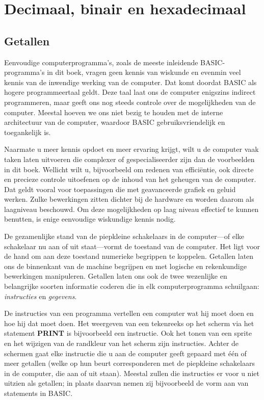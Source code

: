 \chapter{Decimaal, binair en hexadecimaal}
\label{cha:decimal-binary-and-hexadecimal}

\section{Getallen}Eenvoudige computerprogramma's, zoals de meeste inleidende BASIC-programma's in dit boek, vragen geen kennis van wiskunde en evenmin veel kennis van de inwendige werking van de computer. Dat komt doordat BASIC als hogere programmeertaal geldt. Deze taal laat ons de computer enigszins indirect programmeren, maar geeft ons nog steeds controle over de mogelijkheden van de computer. Meestal hoeven we ons niet bezig te houden met de interne architectuur van de computer, waardoor BASIC gebruiksvriendelijk en toegankelijk is.

Naarmate u meer kennis opdoet en meer ervaring krijgt, wilt u de computer vaak taken laten uitvoeren die complexer of gespecialiseerder zijn dan de voorbeelden in dit boek. Wellicht wilt u, bijvoorbeeld om redenen van efficiëntie, ook directe en precieze controle uitoefenen op de inhoud van het geheugen van de computer. Dat geldt vooral voor toepassingen die met geavanceerde grafiek en geluid werken. Zulke bewerkingen zitten dichter bij de hardware en worden daarom als laagniveau beschouwd. Om deze mogelijkheden op laag niveau effectief te kunnen benutten, is enige eenvoudige wiskundige kennis nodig.

De gezamenlijke stand van de piepkleine schakelaars in de computer---of elke schakelaar nu aan of uit staat---vormt de toestand van de computer. Het ligt voor de hand om aan deze toestand numerieke begrippen te koppelen. Getallen laten ons de binnenkant van de machine begrijpen en met logische en rekenkundige bewerkingen manipuleren. Getallen laten ons ook de twee wezenlijke en belangrijke soorten informatie coderen die in elk computerprogramma schuilgaan: {\it instructies} en {\it gegevens}.

De instructies van een programma vertellen een computer wat hij moet doen en hoe hij dat moet doen. Het weergeven van een tekenreeks op het scherm via het statement {\bf PRINT} is bijvoorbeeld een instructie. Ook het tonen van een sprite en het wijzigen van de randkleur van het scherm zijn instructies. Achter de schermen gaat elke instructie die u aan de computer geeft gepaard met één of meer getallen (welke op hun beurt corresponderen met de piepkleine schakelaars in de computer, die aan of uit staan). Meestal zullen die instructies er voor u niet uitzien als getallen; in plaats daarvan nemen zij bijvoorbeeld de vorm aan van statements in BASIC.

